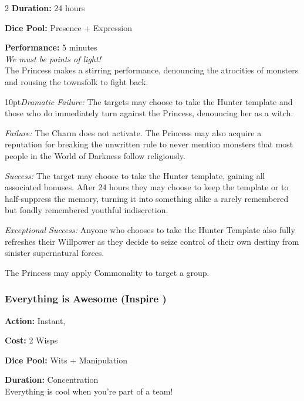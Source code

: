 \begin{multicols}{2}
\noindent \textbf{Duration:} 24 hours 

\noindent \textbf{Dice Pool:} Presence + Expression

\noindent \textbf{Performance:} 5 minutes \\

\noindent \textit{We must be points of light!}\\

\noindent The Princess makes a stirring performance, denouncing the atrocities of monsters and rousing the townsfolk to fight back.

\begin{myindentpar}{10pt}\emph{Dramatic Failure:} The targets may choose to take the Hunter template and those who do immediately turn against the Princess, denouncing her as a witch. 

    \emph{Failure:} The Charm does not activate. The Princess may also acquire a reputation for breaking the unwritten rule to never mention monsters that most people in the World of Darkness follow religiously. 

    \emph{Success:} The target may choose to take the Hunter template, gaining all associated bonuses. After 24 hours they may choose to keep the template or to half-suppress the memory, turning it into something alike a rarely remembered but fondly remembered youthful indiscretion. 

	\emph{Exceptional Success:} Anyone who chooses to take the Hunter Template also fully refreshes their Willpower as they decide to seize control of their own destiny from sinister supernatural forces.  

	\end{myindentpar}
	
The Princess may apply Commonality to target a group. 

\subsubsection*{Everything is Awesome (Inspire \textbullet\textbullet\textbullet\textbullet\textbullet)}

\noindent \textbf{Action:} Instant,

\noindent \textbf{Cost:} 2 Wisps

\noindent \textbf{Dice Pool:} Wits + Manipulation

\noindent \textbf{Duration:} Concentration \\ 

\noindent  Everything is cool when you're part of a team!\\


\end{multicols}
